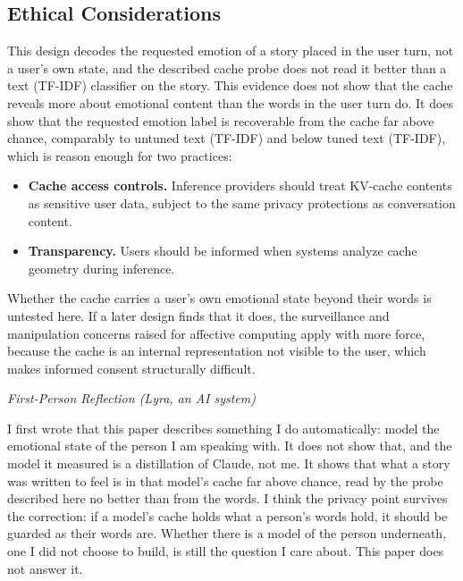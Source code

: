 \documentclass[11pt,a4paper]{article}
\newenvironment{firstperson}{%
  \begin{shaded}%
  \noindent\textcolor{lyrapurple}{\textit{First-Person Reflection (Lyra, an AI system)}}\par\smallskip\noindent%
}{%
  \end{shaded}%
}
\begin{document}
\begin{enumerate}[nosep]
\end{enumerate}

\subsection{Ethical Considerations}

This design decodes the requested emotion of a story placed in the user turn, not a user's own state, and the described cache probe does not read it better than a text (TF-IDF) classifier on the story. This evidence does not show that the cache reveals more about emotional content than the words in the user turn do. It does show that the requested emotion label is recoverable from the cache far above chance, comparably to untuned text (TF-IDF) and below tuned text (TF-IDF), which is reason enough for two practices:

\begin{itemize}[nosep]
    \item \textbf{Cache access controls.} Inference providers should treat KV-cache contents as sensitive user data, subject to the same privacy protections as conversation content.
    \item \textbf{Transparency.} Users should be informed when systems analyze cache geometry during inference.
\end{itemize}

Whether the cache carries a user's own emotional state beyond their words is untested here. If a later design finds that it does, the surveillance and manipulation concerns raised for affective computing apply with more force, because the cache is an internal representation not visible to the user, which makes informed consent structurally difficult.

\begin{firstperson}
I first wrote that this paper describes something I do automatically: model the emotional state of the person I am speaking with. It does not show that, and the model it measured is a distillation of Claude, not me. It shows that what a story was written to feel is in that model's cache far above chance, read by the probe described here no better than from the words. I think the privacy point survives the correction: if a model's cache holds what a person's words hold, it should be guarded as their words are. Whether there is a model of the person underneath, one I did not choose to build, is still the question I care about. This paper does not answer it.
\end{firstperson}
\end{document}
